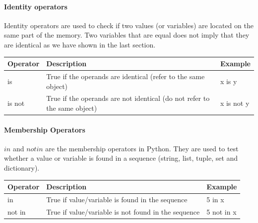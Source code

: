 \documentclass[../main.tex]{subfiles}
\begin{document}
\paragraph{Identity operators} Identity operators are used to check if two values (or variables) are located on the same part of the memory. Two variables that are equal does not imply that they are identical as we have shown in the last section.
\begin{table}[h]
\begin{small}
\centering
\noindent{}
 \noindent \begin{tabular}{|p{}|p{}| p{}| }
  \hline
Operator& Description & Example  \\ \hline
is &	True if the operands are identical (refer to the same object) &	x is y\\ \hline
is not 	& True if the operands are not identical (do not refer to the same object) & x is not y \\ \hline
\end{tabular}
  \label{tab:identity_operators}
  \end{small}
\end{table} 

\paragraph{Membership Operators}
$in$ and $not in$ are the membership operators in Python. They are used to test whether a value or variable is found in a sequence (string, list, tuple, set and dictionary).
\begin{table}[h]
\begin{small}
\centering
\noindent{}
 \noindent \begin{tabular}{|p{}|p{}| p{}| }
  \hline
Operator& Description & Example  \\ \hline
in &	True if value/variable is found in the sequence &	5 in x\\ \hline
not in 	& True if value/variable is not found in the sequence &	5 not in x \\ \hline
\end{tabular}
  \label{tab:membership_operators}
  \end{small}
\end{table} 

\end{document}
